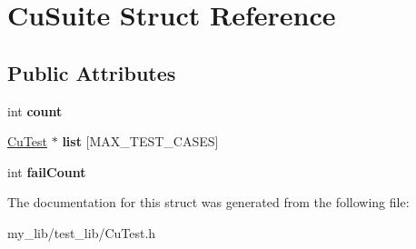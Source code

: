 \hypertarget{structCuSuite}{}\section{Cu\+Suite Struct Reference}
\label{structCuSuite}
\subsection*{Public Attributes}
\begin{DoxyCompactItemize}
\item 
\mbox{\label{structCuSuite_a44b3a5aa4c9b027a6c680c78cdcb9da4}} 
int {\bfseries count}
\item 
\mbox{\label{structCuSuite_a16efbf8411fefbfe58e3c1f7f741241c}} 
\mbox{\hyperlink{structCuTest}{Cu\+Test}} $\ast$ {\bfseries list} \mbox{[}M\+A\+X\+\_\+\+T\+E\+S\+T\+\_\+\+C\+A\+S\+ES\mbox{]}
\item 
\mbox{\label{structCuSuite_ac768ec100a0423c8e9e9a0859c5c5dbd}} 
int {\bfseries fail\+Count}
\end{DoxyCompactItemize}


The documentation for this struct was generated from the following file\+:\begin{DoxyCompactItemize}
\item 
my\+\_\+lib/test\+\_\+lib/Cu\+Test.\+h\end{DoxyCompactItemize}
